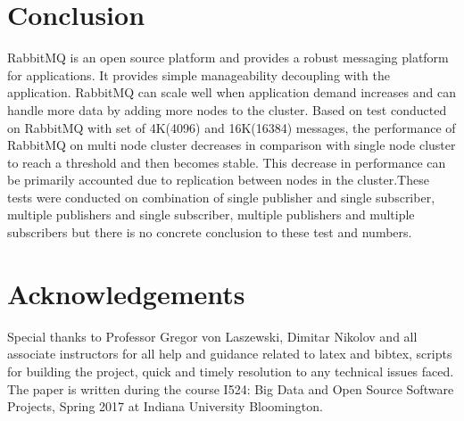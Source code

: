 \documentclass[9pt,twocolumn,twoside]{styles/osajnl}
\begin{document}
\section{Conclusion}
RabbitMQ is an open source platform and provides a robust messaging platform for applications. It provides simple manageability decoupling with the application. RabbitMQ can scale well when application demand increases and can handle more data by adding more nodes to the cluster. Based on test \cite{jones2011rabbitmq}conducted on RabbitMQ with set of 4K(4096) and 16K(16384) messages, the performance of RabbitMQ on multi node cluster decreases in comparison with single node cluster to reach a threshold and then becomes stable. This decrease in performance can be primarily accounted due to replication between nodes in the cluster.These tests were conducted on combination of single publisher and single subscriber, multiple publishers and single subscriber, multiple publishers and multiple subscribers but there is no concrete conclusion to these test and numbers.

\section*{Acknowledgements}
Special thanks to Professor Gregor von Laszewski, Dimitar Nikolov and all associate instructors for all help and guidance related to latex and bibtex, scripts for building the project, quick and timely resolution to any technical issues faced. The paper is written during the course  {I524: Big Data and Open Source Software Projects, Spring 2017} at Indiana University Bloomington.

 
\medskip

% 

\end{document}
